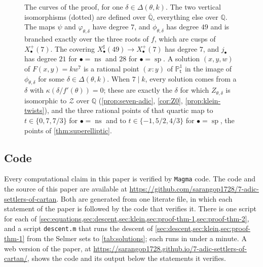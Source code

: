 \documentclass[12pt]{amsart}
\renewcommand{\P}{\mathbb{P}}
\newcommand{\Q}{\mathbb{Q}}
\newcommand{\Qbar}{{\overline{\Q}}}
\newcommand{\Pone}{\P^{1}}
\newcommand{\calF}{{\mathcal F}}
\newcommand{\calZ}{{\mathcal Z}}
\renewcommand{\t}{\mathsf{t}}
\DeclareMathOperator{\ns}{ns}
\DeclareMathOperator{\spc}{sp}
\newcommand{\Magma}{\texttt{Magma}\xspace}
\numberwithin{equation}{section}
\theoremstyle{definition}
\begin{document}
\begin{figure}[ht]
  \centering
  \caption{The curves of the proof, for one $\delta \in \Delta(\theta,k)$. The two
    vertical isomorphisms (dotted) are defined over $\Qbar$, everything else over $\Q$. The maps $\psi$ and
    $\varphi_{\theta,\delta}$ have degree $7$, and $\phi_{\theta,\delta}$ has
    degree $49$ and is branched exactly over the three roots of $f$, which are
    cusps of $X_{\bullet}^{+}(7)$. The covering $X_{\bullet}^{\sharp}(49) \to
    X_{\bullet}^{+}(7)$ has degree $7$, and $j_{\bullet}$ has degree $21$ for
    $\bullet = \ns$ and $28$ for $\bullet = \spc$. A solution $(x,y,w)$ of
    $F(x,y) = kw^{7}$ is a rational point $(x:y)$ of $\Pone_{\t}$ in the image of
    $\phi_{\theta,\delta}$ for some $\delta \in \Delta(\theta,k)$. When $7 \mid k$, every
    solution comes from a $\delta$ with $\kappa(\delta/f'(\theta)) = 0$; these
    are exactly the $\delta$ for which $Z_{\theta,\delta}$ is isomorphic to
    $\calZ$ over $\Q$ (\cref{prop:seven-adic}, \cref{cor:Z0},
    \cref{prop:klein-twists}), and the three rational points of
    that quartic map to $t \in \{0, 7, 7/3\}$ for $\bullet = \ns$ and to
    $t \in \{-1, 5/2, 4/3\}$ for $\bullet = \spc$, the points of
    \cref{thm:superelliptic}.}
  \label{fig:tower}
\end{figure}

\subsection*{Code}
Every computational claim in this paper is verified by \Magma{} \cite{Magma}
code. The code and the source of this paper are available at
\url{https://github.com/sarangop1728/7-adic-settlers-of-cartan}. Both are generated
from one literate file, in which each statement of the paper is followed by the
code that verifies it. There is one
script for each of
\cref{sec:equations,sec:descent,sec:klein,sec:proof-thm-1,sec:proof-thm-2}, and
a script \texttt{descent.m} that runs the descent of
\cref{sec:descent,sec:klein,sec:proof-thm-1} from the Selmer sets to
\cref{tab:solutions}; each runs in under a minute. A web version of the
paper, at \url{https://sarangop1728.github.io/7-adic-settlers-of-cartan/}, shows the
code and its output below the statements it verifies.
\end{document}
